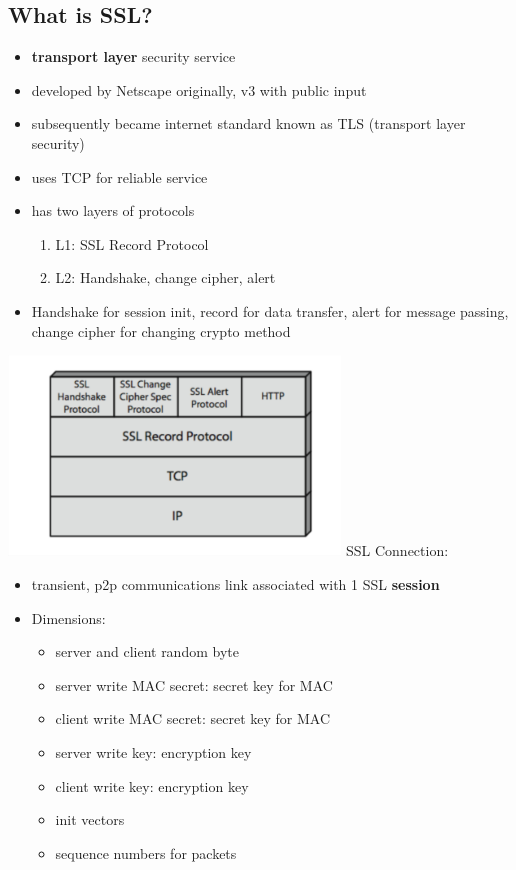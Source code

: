 \documentclass{article}
\begin{document}
\subsection{What is SSL?}
\begin{itemize}
    \item \textbf{transport layer} security service
    \item developed by Netscape originally, v3 with public input
    \item subsequently became internet standard known as TLS (transport layer security)
    \item uses TCP for reliable service
    \item has two layers of protocols
    \begin{enumerate}
        \item L1: SSL Record Protocol
        \item L2: Handshake, change cipher, alert
    \end{enumerate}
    \item Handshake for session init, record for data transfer, alert for message passing, change cipher for changing crypto method
\end{itemize}
\includegraphics[width= 250pt]{sslstack.png}
SSL Connection:
\begin{itemize}
    \item transient, p2p communications link associated with 1 SSL \textbf{session}
    \item Dimensions:
    \begin{itemize}
        \item server and client random byte
        \item server write MAC secret: secret key for MAC
        \item client write MAC secret: secret key for MAC
        \item server write key: encryption key
        \item client write key: encryption key
        \item init vectors
        \item sequence numbers for packets
    \end{itemize}
\end{itemize}
\end{document}
